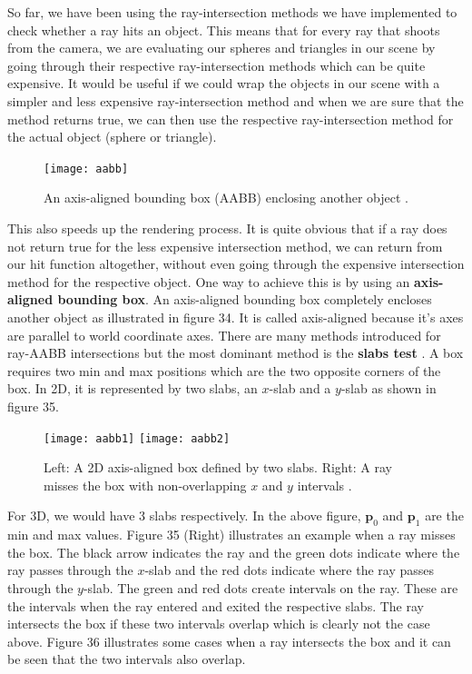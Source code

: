 \documentclass[11pt,a4paper]{article}
\begin{document}
	So far, we have been using the ray-intersection methods we have implemented to check whether a ray hits an object. This means that for every ray that shoots from the camera, we are evaluating our spheres and triangles in our scene by going through their respective ray-intersection methods which can be quite expensive. It would be useful if we could wrap the objects in our scene with a simpler and less expensive ray-intersection method and when we are sure that the method returns true, we can then use the respective ray-intersection method for the actual object (sphere or triangle).
	\begin{figure}[H]
		\centering
		\captionsetup{justification=centering}
		\texttt{[image: aabb]}\quad
		\caption{An axis-aligned bounding box (AABB) enclosing another object \protect\cite{ericson2004real}.}
	\end{figure}
	\noindent
	This also speeds up the rendering process. It is quite obvious that if a ray does not return true for the less expensive intersection method, we can return from our hit function altogether, without even going through the expensive intersection method for the respective object. One way to achieve this is by using an \textbf{axis-aligned bounding box}. An axis-aligned bounding box completely encloses another object as illustrated in figure 34. It is called axis-aligned because it's axes are parallel to world coordinate axes. There are many methods introduced for ray-AABB intersections but the most dominant method is the \textbf{slabs test} \cite{kay1986ray}.
	\noindent
	A box requires two min and max positions which are the two opposite corners of the box. In 2D, it is represented by two slabs, an $x$-slab and a $y$-slab as shown in figure 35.
	\begin{figure}[H]
		\centering
		\captionsetup{justification=centering}
		\texttt{[image: aabb1]}\quad
		\texttt{[image: aabb2]}\quad
		\caption{Left: A 2D axis-aligned box defined by two slabs. Right: A ray misses the box with non-overlapping $x$ and $y$ intervals \protect\cite{suffern2016ray}.}
	\end{figure}
	\noindent
	For 3D, we would have 3 slabs respectively. In the above figure, $\boldsymbol{p}_{0}$ and $\boldsymbol{p}_{1}$ are the min and max values. Figure 35 (Right) illustrates an example when a ray misses the box. The black arrow indicates the ray and the green dots indicate where the ray passes through the $x$-slab and the red dots indicate where the ray passes through the $y$-slab. The green and red dots create intervals on the ray. These are the intervals when the ray entered and exited the respective slabs. The ray intersects the box if these two intervals overlap which is clearly not the case above. Figure 36 illustrates some cases when a ray intersects the box and it can be seen that the two intervals also overlap.
\end{document}
